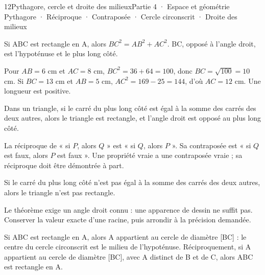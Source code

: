 \begin{ouverture}[geometrie]{12}{Pythagore, cercle et droite des milieux}{Partie 4 · Espace et géométrie}
{Pythagore · Réciproque · Contraposée · Cercle circonscrit · Droite des milieux}
\end{ouverture}
\pagestyle{otMain}\essentiel\fontsize{11}{15}\selectfont
{}
\begin{propriete}Si ABC est rectangle en A, alors $BC^2=AB^2+AC^2$. BC, opposé à l’angle droit, est l’hypoténuse et le plus long côté.\end{propriete}
\begin{savoirfaire}Pour $AB=6$ cm et $AC=8$ cm, $BC^2=36+64=100$, donc $BC=\sqrt{100}=10$ cm. Si $BC=13$ cm et $AB=5$ cm, $AC^2=169-25=144$, d’où $AC=12$ cm. Une longueur est positive.\end{savoirfaire}
\begin{propriete}[Réciproque]Dans un triangle, si le carré du plus long côté est égal à la somme des carrés des deux autres, alors le triangle est rectangle, et l’angle droit est opposé au plus long côté.\end{propriete}
\begin{definition}La réciproque de « si $P$, alors $Q$ » est « si $Q$, alors $P$ ». Sa contraposée est « si $Q$ est faux, alors $P$ est faux ». Une propriété vraie a une contraposée vraie ; sa réciproque doit être démontrée à part.\end{definition}
\begin{propriete}Si le carré du plus long côté n’est pas égal à la somme des carrés des deux autres, alors le triangle n’est pas rectangle.\end{propriete}
\begin{attention}Le théorème exige un angle droit connu : une apparence de dessin ne suffit pas. Conserver la valeur exacte d’une racine, puis arrondir à la précision demandée.\end{attention}
\clearpage
{}
\begin{propriete}Si ABC est rectangle en A, alors A appartient au cercle de diamètre [BC] : le centre du cercle circonscrit est le milieu de l’hypoténuse. Réciproquement, si A appartient au cercle de diamètre [BC], avec A distinct de B et de C, alors ABC est rectangle en A.\end{propriete}
